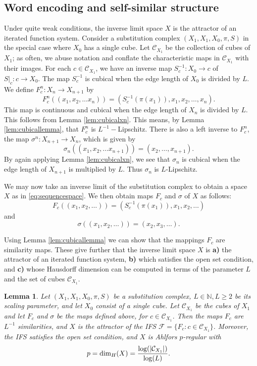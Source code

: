 \documentclass{amsart}
\theoremstyle{plain}
\newtheorem{lemma}[theorem]{Lemma}
\theoremstyle{definition}
\numberwithin{equation}{section}
\numberwithin{theorem}{section}
\newcommand{\N}{\mathbb{N}}
\newcommand{\cF}{\mathcal{F}}
\newcommand{\cC}{\mathcal{C}}
\begin{document}
\subsection{Word encoding and self-similar structure}\label{subsec:wordencoding}
Under quite weak conditions, the inverse limit space $X$ is the attractor of an iterated function system. 
 Consider a substitution complex $(X_1,X_1,X_0, \pi, S)$ in the special case where $X_0$ has a single cube. Let $\cC_{X_1}$ be the collection of cubes of $X_1$; as often, we abuse notation and conflate the characteristic maps in $\cC_{X_1}$ with their images. For each $c\in \cC_{X_1}$, we have an inverse map $S_c^{-1}:X_0\to c$ of $S|_{c}:c\to X_0$. The map $S_c^{-1}$ is cubical when the edge length of $X_0$ is divided by $L$. We define $F_c^n:X_n\to X_{n+1}$ by 
\[
F_c^n((x_1,x_2, \dots x_n)) = (S_{c}^{-1}(\pi(x_1)), x_1, x_2, \dots, x_n).
\]
This map is continuous and cubical when the edge length of $X_n$ is divided by $L$. This follows from Lemma \ref{lem:cubicalxn}. This means, by Lemma \ref{lem:cubicallemma}, that $F^n_c$ is $L^{-1}-$Lipschitz. There is also a left inverse to $F^n_c$, the map $\sigma^n:X_{n+1}\to X_n$, which is given by
\[
\sigma_n((x_1,x_2, \dots x_{n+1}))=(x_2,\dots, x_{n+1}).
\]
By again applying Lemma \ref{lem:cubicalxn}, we see that $\sigma_n$ is cubical when the edge length of $X_{n+1}$ is multiplied by $L$. Thus $\sigma_n$ is $L$-Lipschitz.

We may now take an inverse limit of the substitution complex to obtain a space $X$ as in \eqref{eq:sequencespace}. We then obtain maps $F_c$ and $\sigma$ of $X$ as follows:
\[
F_c((x_1,x_2, \dots)) = (S_{c}^{-1}(\pi(x_1)), x_1, x_2, \dots)
\]
and
\[
\sigma((x_1,x_2, \dots ))=(x_2, x_3, \dots).
\]

Using Lemma \ref{lem:cubicallemma} we can show that the mappings $F_c$ are similarity maps. These give further that the inverse limit space $X$ is \textbf{a)} the attractor of an iterated function system, \textbf{b)} which satisfies the open set condition, and \textbf{c)} whose Hausdorff dimension can be computed in terms of the parameter $L$ and the set of cubes $\cC_{X_1}$.

\begin{lemma}\label{lem:IFS} Let $(X_1,X_1,X_0, \pi, S)$ be a substitution complex, $L\in\N, L\geq 2$ be its scaling parameter, and let $X_0$ consist of a single cube. Let $\cC_{X_1}$ be the cubes of $X_1$ and let $F_c$ and $\sigma$ be the maps defined above, for $c\in \cC_{X_1}$. Then the maps $F_c$ are $L^{-1}$ similarities, and $X$ is the attractor of the IFS $\cF=\{F_c : c\in \cC_{X_1}\}$. Moreover, the IFS satisfies the open set condition, and $X$ is Ahlfors $p$-regular with
\[
p={\rm dim}_H(X)=\frac{\log(|\cC_{X_1}|)}{\log(L)}.
\]
\end{lemma}
\end{document}
